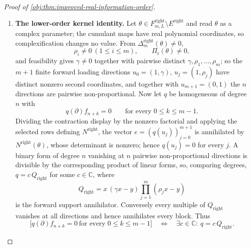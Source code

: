 \begin{proof}[Proof of \cref{obj:thm:improved-real-information-order}]
\begin{enumerate}
\item \textbf{The lower-order kernel identity.}  Let \(\theta\in F^{\mathrm{right}}_{m,L}\setminus E^{\mathrm{right}}\) and read \(\theta\) as a complex parameter; the cumulant maps have real polynomial coordinates, so complexification changes no value.  From \(\Delta^{\mathrm{right}}_m(\theta)\ne0\),
\[
\rho_i\ne0\ (1\le i\le m),
\qquad
\Pi_{\mathrm r}(\theta)\ne0 ,
\]
and feasibility gives \(\gamma\ne0\) together with pairwise distinct \(\gamma,\rho_1,\ldots,\rho_m\); so the \(m+1\) finite forward loading directions \(u_0=(1,\gamma)\), \(u_j=(1,\rho_j)\) have distinct nonzero second coordinates, and together with \(u_{m+1}=(0,1)\) the \(n\) directions are pairwise non-proportional.  Now let \(q\) be homogeneous of degree \(n\) with
\[
q(\partial)f_{n+k}=0
\qquad\text{for every }0\le k\le m-1 .
\]
Dividing the contraction display by the nonzero factorial and applying the selected rows defining \(N^{\mathrm{right}}\), the vector \(e=(q(u_j))_{j=0}^{m+1}\) is annihilated by \(N^{\mathrm{right}}(\theta)\), whose determinant is nonzero; hence \(q(u_j)=0\) for every \(j\).  A binary form of degree \(n\) vanishing at \(n\) pairwise non-proportional directions is divisible by the corresponding product of linear forms, so, comparing degrees, \(q=c\,Q_{\mathrm{right}}\) for some \(c\in\mathbb C\), where
\[
Q_{\mathrm{right}}=x\,(\gamma x-y)\prod_{j=1}^{m}(\rho_jx-y)
\]
is the forward support annihilator.  Conversely every multiple of \(Q_{\mathrm{right}}\) vanishes at all directions and hence annihilates every block.  Thus
\[
\bigl[q(\partial)f_{n+k}=0\ \text{for every }0\le k\le m-1\bigr]
\quad\Longleftrightarrow\quad
\exists c\in\mathbb C:\ q=c\,Q_{\mathrm{right}} .
\]


\end{enumerate}
\end{proof}
